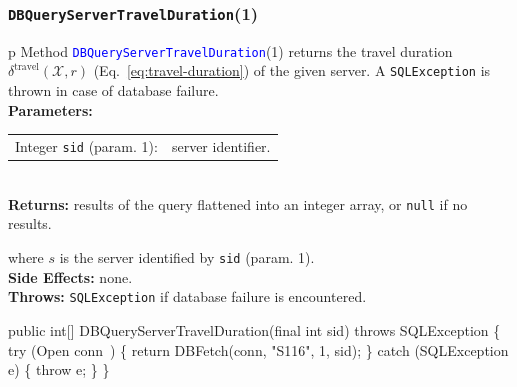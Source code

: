 \documentclass{article}
\def\nwendcode{\endtrivlist \endgroup}      %
\let\nwdocspar=\par
\theoremstyle{definition}                   %
\begin{document}
\subsubsection{{\tt{}\protect{}DBQueryServerTravelDuration}(1)}
\begin{tabular}{p{\textwidth}}
\toprule
{}
Method \textcolor{blue}{{\tt{}\protect{}DBQueryServerTravelDuration}}(1) returns the
travel duration $\delta^\textrm{travel}(\mathcal{X},r)$
(Eq.~\ref{eq:travel-duration}) of the given server.
A {\tt{}SQLException} is thrown in case of database failure.\\
\midrule
\textbf{Parameters:}\\
\begin{tabular}{lp{116mm}}
Integer {\tt{}sid} (param. 1):&server identifier.
\end{tabular}\\
\textbf{Returns:} results of the query flattened into an integer array,
or {\tt{}null} if no results.


where $s$ is the server identified by {\tt{}sid} (param. 1).\\
\textbf{Side Effects:} none.\\
\textbf{Throws:} {\tt{}SQLException} if database failure is encountered.\\
\bottomrule
\end{tabular}
\nwenddocs{}\plusendmoddef
public int[] DBQueryServerTravelDuration(final int sid) throws SQLException \{
  try (\LA{}Open \code{}conn\edoc{}~{\nwtagstyle{}}\RA{}) \{
    return DBFetch(conn, "S116", 1, sid);
  \} catch (SQLException e) \{
    throw e;
  \}
\}
\eatline
{}\nwendcode{}\nwdocspar
\end{document}
